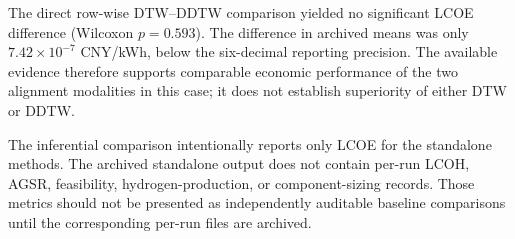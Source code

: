 The direct row-wise DTW--DDTW comparison yielded no significant LCOE
difference (Wilcoxon $p=0.593$). The difference in archived means was only
$7.42\times10^{-7}$ CNY/kWh, below the six-decimal reporting precision. The
available evidence therefore supports comparable economic performance of the
two alignment modalities in this case; it does not establish superiority of
either DTW or DDTW.

\begin{table}[p]
\centering
\scriptsize
\caption{Archived HRES2--H2 LCOE inferential comparison over 31 runs. The
pairwise values are unadjusted Wilcoxon signed-rank $p$-values.}
\label{tab:hres2-pvalues-revision-en}
\end{table}

The inferential comparison intentionally reports only LCOE for the standalone
methods. The archived standalone output does not contain per-run LCOH, AGSR,
feasibility, hydrogen-production, or component-sizing records. Those metrics
should not be presented as independently auditable baseline comparisons until
the corresponding per-run files are archived.

